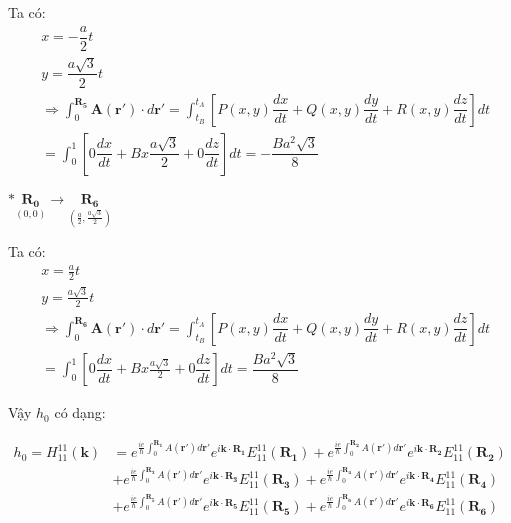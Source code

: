 \documentclass{article}
\begin{document}
Ta có:
\begin{align}
     & x = -\dfrac{a}{2}t \nonumber                                                                                                                                                                     \\
     & y = \dfrac{a\sqrt{3}}{2}t \nonumber                                                                                                                                                              \\
     & \Rightarrow \int_{0}^{\mathbf{R_5}} \mathbf{A}(\mathbf{r'})\cdot d\mathbf{r'} =  \int_{t_B}^{t_A} \left[ P(x,y)\dfrac{dx}{dt} + Q(x,y)\dfrac{dy}{dt} + R(x,y)\dfrac{dz}{dt} \right] dt \nonumber \\
     & = \int_{0}^{1} \left[ 0\dfrac{dx}{dt} + Bx\dfrac{a\sqrt{3}}{2} + 0\dfrac{dz}{dt} \right] dt = -\dfrac{Ba^2\sqrt{3}}{8}  \nonumber
\end{align}

\noindent $\ast \underset{(0,0)}{\mathbf{R_0}}  \longrightarrow \underset{(\frac{a}{2},\frac{a\sqrt{3}}{2})}{\mathbf{R_6}}$

Ta có:
\begin{align}
     & x = \frac{a}{2}t \nonumber                                                                                                                                                                       \\
     & y = \frac{a\sqrt{3}}{2}t \nonumber                                                                                                                                                               \\
     & \Rightarrow \int_{0}^{\mathbf{R_6}} \mathbf{A}(\mathbf{r'})\cdot d\mathbf{r'} =  \int_{t_B}^{t_A} \left[ P(x,y)\dfrac{dx}{dt} + Q(x,y)\dfrac{dy}{dt} + R(x,y)\dfrac{dz}{dt} \right] dt \nonumber \\
     & = \int_{0}^{1} \left[ 0\dfrac{dx}{dt} + Bx \frac{a\sqrt{3}}{2} + 0\dfrac{dz}{dt} \right] dt = \dfrac{Ba^2\sqrt{3}}{8} \nonumber
\end{align}

Vậy $h_0$ có dạng:

\begin{align}
    h_0 = H_{11}^{11}(\textbf{k}) & = e^{\frac{ie}{\hbar}\int_{0}^{\mathbf{R_1}}A(\mathbf{r'})d\mathbf{r'}}e^{i\mathbf{k\cdot R_1}} E_{11}^{11}(\mathbf{R_1}) + e^{\frac{ie}{\hbar}\int_{0}^{\mathbf{R_2}}A(\mathbf{r'})d\mathbf{r'}}e^{i\mathbf{k\cdot R_2}} E_{11}^{11}(\mathbf{R_2}) \nonumber \\
                                  & + e^{\frac{ie}{\hbar}\int_{0}^{\mathbf{R_3}}A(\mathbf{r'})d\mathbf{r'}}e^{i\mathbf{k\cdot R_3}} E_{11}^{11}(\mathbf{R_3}) + e^{\frac{ie}{\hbar}\int_{0}^{\mathbf{R_4}}A(\mathbf{r'})d\mathbf{r'}}e^{i\mathbf{k\cdot R_4}} E_{11}^{11}(\mathbf{R_4}) \nonumber \\
                                  & + e^{\frac{ie}{\hbar}\int_{0}^{\mathbf{R_5}}A(\mathbf{r'})d\mathbf{r'}}e^{i\mathbf{k\cdot R_5}} E_{11}^{11}(\mathbf{R_5}) + e^{\frac{ie}{\hbar}\int_{0}^{\mathbf{R_6}}A(\mathbf{r'})d\mathbf{r'}}e^{i\mathbf{k\cdot R_6}} E_{11}^{11}(\mathbf{R_6}) \nonumber
\end{align}
\end{document}
